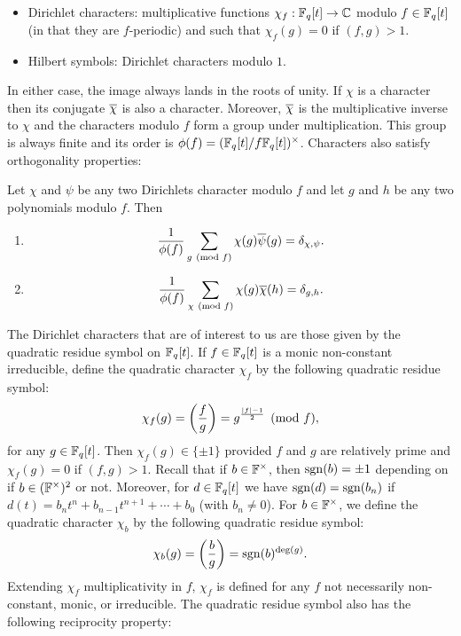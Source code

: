 \documentclass[12pt,reqno,oneside]{amsart}
\begin{document}
    \begin{itemize}
        \item Dirichlet characters: multiplicative functions $\chi_{f}:\mathbb{F}_{q}[t] \to \mathbb{C}$ modulo $f \in \mathbb{F}_{q}[t]$ (in that they are $f$-periodic) and such that $\chi_{f}(g) = 0$ if $(f,g) > 1$.
        \item Hilbert symbols: Dirichlet characters modulo $1$.
    \end{itemize}
    
    In either case, the image always lands in the roots of unity. If $\chi$ is a character then its conjugate $\overline{\chi}$ is also a character. Moreover, $\overline{\chi}$ is the multiplicative inverse to $\chi$ and the characters modulo $f$ form a group under multiplication. This group is always finite and its order is $\phi(f) = (\mathbb{F}_{q}[t]/f\mathbb{F}_{q}[t])^{\times}$. Characters also satisfy orthogonality properties:

    \begin{theorem}
        Let $\chi$ and $\psi$ be any two Dirichlets character modulo $f$ and let $g$ and $h$ be any two polynomials modulo $f$. Then
        \begin{enumerate}[label=(\roman*)]
          \item
          \[
            \frac{1}{\phi(f)}\sum_{g \ \left(\text{mod }f\right)}\chi(g)\overline{\psi}(g) = \delta_{\chi,\psi}.
          \]
          \item
          \[
            \frac{1}{\phi(f)}\sum_{\chi \ \left(\text{mod }f\right)}\chi(g)\overline{\chi}(h) = \delta_{g,h}.
          \]
        \end{enumerate}
    \end{theorem}

    The Dirichlet characters that are of interest to us are those given by the quadratic residue symbol on $\mathbb{F}_{q}[t]$. If $f \in \mathbb{F}_{q}[t]$ is a monic non-constant irreducible, define the quadratic character $\chi_{f}$ by the following quadratic residue symbol:
    \[
        \chi_{f}(g) = \left(\frac{f}{g}\right) = g^{\frac{|f|-1}{2}} \pmod{f},
    \]
    for any $g \in \mathbb{F}_{q}[t]$. Then $\chi_{f}(g) \in \{\pm 1\}$ provided $f$ and $g$ are relatively prime and $\chi_{f}(g) = 0$ if $(f,g) > 1$. Recall that if $b \in \mathbb{F}^{\times}$, then $\operatorname{\mathrm{sgn}}(b) = \pm1$ depending on if $b \in (\mathbb{F}^{\times})^{2}$ or not. Moreover, for $d \in \mathbb{F}_{q}[t]$ we have $\operatorname{\mathrm{sgn}}(d) = \operatorname{\mathrm{sgn}}(b_{n})$ if $d(t) = b_{n}t^{n}+b_{n-1}t^{n+1}+\cdots+b_{0}$ (with $b_{n} \neq 0$). For $b \in \mathbb{F}^{\times}$, we define the quadratic character $\chi_{b}$ by the following quadratic residue symbol:
    \[
        \chi_{b}(g) = \left(\frac{b}{g}\right) = \operatorname{\mathrm{sgn}}(b)^{\deg(g)}.
    \]
    Extending $\chi_{f}$ multiplicativity in $f$, $\chi_{f}$ is defined for any $f$ not necessarily non-constant, monic, or irreducible. The quadratic residue symbol also has the following reciprocity property:
\end{document}

